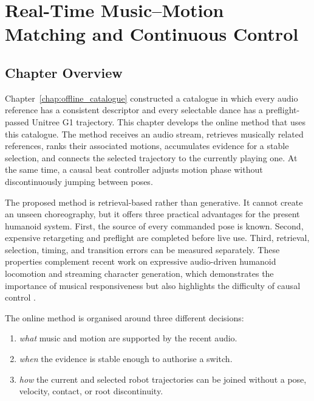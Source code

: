 
\chapter{Real-Time Music--Motion Matching and Continuous Control}
\label{chap:realtime_matching_control}

\section{Chapter Overview}
\label{sec:ch5_overview}

Chapter~\ref{chap:offline_catalogue} constructed a catalogue in which every
audio reference has a consistent descriptor and every selectable dance has a
preflight-passed Unitree G1 trajectory. This chapter develops the online method
that uses this catalogue. The method receives an audio stream, retrieves
musically related references, ranks their associated motions, accumulates
evidence for a stable selection, and connects the selected trajectory to the
currently playing one. At the same time, a causal beat controller adjusts
motion phase without discontinuously jumping between poses.

The proposed method is retrieval-based rather than generative. It cannot create
an unseen choreography, but it offers three practical advantages for the
present humanoid system. First, the source of every commanded pose is known.
Second, expensive retargeting and preflight are completed before live use.
Third, retrieval, selection, timing, and transition errors can be measured
separately. These properties complement recent work on expressive audio-driven
humanoid locomotion and streaming character generation, which demonstrates the
importance of musical responsiveness but also highlights the difficulty of
causal control \cite{li2026you,ji2026discoforcing}.

The online method is organised around three different decisions:

\begin{enumerate}[label=(\arabic*)]
    \item \emph{what} music and motion are supported by the recent audio.
    \item \emph{when} the evidence is stable enough to authorise a switch.
    \item \emph{how} the current and selected robot trajectories can be joined
          without a pose, velocity, contact, or root discontinuity.
\end{enumerate}



